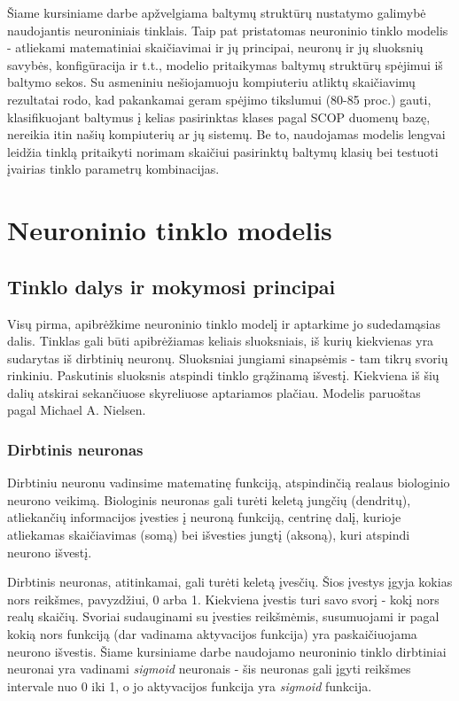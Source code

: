 \documentclass[a4paper,12pt]{article}
\begin{document}
Šiame kursiniame darbe apžvelgiama baltymų struktūrų nustatymo galimybė naudojantis neuroniniais tinklais. Taip pat pristatomas neuroninio tinklo modelis - atliekami matematiniai skaičiavimai ir jų principai, neuronų ir jų sluoksnių savybės, konfigūracija ir t.t., modelio pritaikymas baltymų struktūrų spėjimui iš baltymo sekos. Su asmeniniu nešiojamuoju kompiuteriu atliktų skaičiavimų rezultatai rodo, kad pakankamai geram spėjimo tikslumui (80-85 proc.) gauti, klasifikuojant baltymus į kelias pasirinktas klases pagal SCOP duomenų bazę, nereikia itin našių kompiuterių ar jų sistemų. Be to, naudojamas modelis lengvai leidžia tinklą pritaikyti norimam skaičiui pasirinktų baltymų klasių bei testuoti įvairias tinklo parametrų kombinacijas.
\newpage
\section{Neuroninio tinklo modelis}
\subsection{Tinklo dalys ir mokymosi principai}
\indent\indent
Visų pirma, apibrėžkime neuroninio tinklo modelį ir aptarkime jo sudedamąsias dalis. Tinklas gali būti apibrėžiamas keliais sluoksniais, iš kurių kiekvienas yra sudarytas iš dirbtinių neuronų. Sluoksniai jungiami sinapsėmis - tam tikrų svorių rinkiniu. Paskutinis sluoksnis atspindi tinklo grąžinamą išvestį. Kiekviena iš šių dalių atskirai sekančiuose skyreliuose aptariamos plačiau. Modelis paruoštas pagal Michael A. Nielsen\cite{michaelnielsen}.
\subsubsection{Dirbtinis neuronas}
\indent\indent
Dirbtiniu neuronu vadinsime matematinę funkciją, atspindinčią realaus biologinio neurono veikimą. Biologinis neuronas gali turėti keletą jungčių (dendritų), atliekančių informacijos įvesties į neuroną funkciją, centrinę dalį, kurioje atliekamas skaičiavimas (somą) bei išvesties jungtį (aksoną), kuri atspindi neurono išvestį.

Dirbtinis neuronas, atitinkamai, gali turėti keletą įvesčių. Šios įvestys įgyja kokias nors reikšmes, pavyzdžiui, 0 arba 1. Kiekviena įvestis turi savo svorį - kokį nors realų skaičių. Svoriai sudauginami su įvesties reikšmėmis, susumuojami ir pagal kokią nors funkciją (dar vadinama aktyvacijos funkcija) yra paskaičiuojama neurono išvestis. Šiame kursiniame darbe naudojamo neuroninio tinklo dirbtiniai neuronai yra vadinami \textit{sigmoid} neuronais - šis neuronas gali įgyti reikšmes intervale nuo 0 iki 1, o jo aktyvacijos funkcija yra \textit{sigmoid} funkcija.
\end{document}
